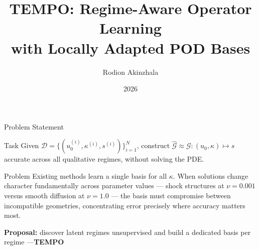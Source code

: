 \documentclass[aspectratio=169]{beamer}
\title[TEMPO]{TEMPO: Regime-Aware Operator Learning \\ with Locally Adapted POD Bases}
\author{
    Rodion Akinzhala 
}
\date{2026}
\newcommand{\cG}{\mathcal{G}}
\newcommand{\cD}{\mathcal{D}}
\begin{document}
\begin{frame}
\thispagestyle{empty}
\maketitle
\end{frame}

\begin{frame}{Problem Statement}

\begin{block}{Task}
  Given $\cD = \{(u_0^{(i)},\kappa^{(i)},s^{(i)})\}_{i=1}^N$,
  construct $\hat{\cG}\approx\cG\colon(u_0,\kappa)\mapsto s$
  accurate across all qualitative regimes, without solving the PDE.
\end{block}

\begin{block}{Problem}
  Existing methods learn a single basis for all $\kappa$.
  When solutions change character fundamentally across parameter values —
  shock structures at $\nu{=}0.001$ versus smooth diffusion at $\nu{=}1.0$ —
  the basis must compromise between incompatible geometries,
  concentrating error precisely where accuracy matters most.
\end{block}


\medskip
\textbf{Proposal:} discover latent regimes unsupervised and build a dedicated basis per regime —{\textbf{TEMPO}}

\end{frame}
\end{document}
